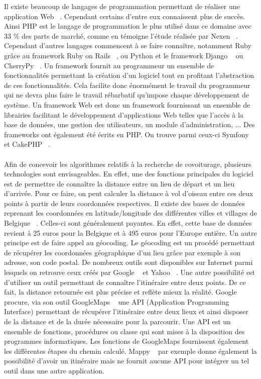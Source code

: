 \documentclass[12pt, a4paper, oneside]{article}
\begin{document}
    \indent Il existe beaucoup de langages de programmation permettant de réaliser une application Web ~\cite{web-development}. Cependant certains d'entre eux connaissent plus de succès. Ainsi PHP est le langage de programmation le plus utilisé dans ce domaine avec 33 $\%$ des parts de marché, comme en témoigne l'étude réalisée par Nexen ~\cite{stats-PHP}. Cependant d'autres langages commencent à se faire connaître, notamment Ruby grâce au framework Ruby on Rails ~\cite{ROR}, ou Python et le framework Django ~\cite{Django} ou CherryPy ~\cite{CherryPy}. Un framework fournit au programmeur un ensemble de fonctionnalités permettant la création d'un logiciel tout en profitant l'abstraction de ces fonctionnalités. Cela facilite donc énormément le travail du programmeur qui ne devra plus faire le travail rébarbatif qu'impose chaque développement de système. Un framework Web est donc un framework fournissant un ensemble de librairies facilitant le développement d'applications Web telles que l'accès à la base de données, une gestion des utilisateurs, un module d'administration, ... Des frameworks ont également été écrits en PHP. On trouve parmi ceux-ci Symfony ~\cite{Symfony} et CakePHP ~\cite{CakePHP}.\\\\
    \indent Afin de concevoir les algorithmes relatifs à la recherche de covoiturage, plusieurs technologies sont envisageables. En effet, une des fonctions principales du logiciel est de permettre de connaître la distance entre un lieu de départ et un lieu d'arrivée. Pour ce faire, on peut calculer la distance à vol d'oiseau entre ces deux points à partir de leurs coordonnées respectives. Il existe des bases de données reprenant les coordonnées en latitude/longitude des différentes villes et villages de Belgique ~\cite{zip-code-DB}. Celles-ci sont généralement payantes. En effet, cette base de données revient à 25 euros pour la Belgique et à 495 euros pour l'Europe entière. Un autre principe est de faire appel au géocoding. Le géocoding est un procédé permettant de récupérer les coordonnées géographique d'un lieu grâce par exemple à son adresse, son code postal. De nombreux outils sont disponibles sur Internet parmi lesquels on retrouve ceux créés par Google ~\cite{google-geoconding} et Yahoo ~\cite{yahoo-geocoding}. Une autre possibilité est d'utiliser un outil permettant de connaître l'itinéraire entre deux points. De ce fait, la distance retournée est plus précise et reflète mieux la réalité. Google procure, via son outil GoogleMaps ~\cite{google-map} une API (Application Programming Interface) permettant de récupérer l'itinéraire entre deux lieux et ainsi disposer de la distance et de la durée nécessaire pour la parcourir. Une API est un ensemble de fonctions, procédures ou classe qui sont mises à la disposition des programmes informatiques. Les fonctions de GoogleMaps fournissent également les différentes étapes du chemin calculé. Mappy ~\cite{Mappy} par exemple donne également la possibilité d'avoir un itinéraire mais ne fournit aucune API pour intégrer un tel outil dans une autre application.
\end{document}
